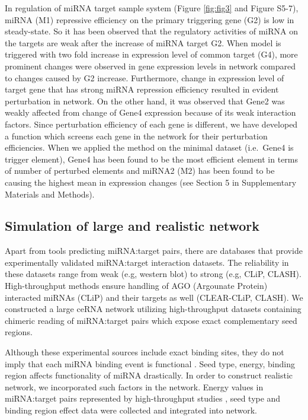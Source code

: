 \documentclass[a4,center,fleqn]{NAR}
\begin{document}
In regulation of miRNA target sample system (Figure \ref{fig:fig3} and
Figure S5-7), miRNA (M1) repressive efficiency on the primary triggering
gene (G2) is low in steady-state. So it has been observed that the
regulatory activities of miRNA on the targets are weak after the
increase of miRNA target G2. When model is triggered with two fold
increase in expression level of common target (G4), more prominent
changes were observed in gene expression levels in network compared to
changes caused by G2 increase. Furthermore, change in expression level
of target gene that has strong miRNA repression efficiency resulted in
evident perturbation in network. On the other hand, it was observed that
Gene2 was weakly affected from change of Gene4 expression because of its
weak interaction factors. Since perturbation efficiency of each gene is
different, we have developed a function which screens each gene in the
network for their perturbation efficiencies. When we applied the method
on the minimal dataset (i.e.~Gene4 is trigger element), Gene4 has been
found to be the most efficient element in terms of number of perturbed
elements and miRNA2 (M2) has been found to be causing the highest mean
in expression changes (see Section 5 in Supplementary Materials and
Methods).

\subsection{Simulation of large and realistic network}

Apart from tools predicting miRNA:target pairs, there are databases that
provide experimentally validated miRNA:target interaction datasets. The
reliability in these datasets range from weak (e.g, western blot) to
strong (e.g, CLiP, CLASH). High-throughput methods ensure handling of
AGO (Argounate Protein) interacted miRNAs (CLiP) and their targets as
well (CLEAR-CLiP, CLASH). We constructed a large ceRNA network utilizing
high-throughput datasets containing chimeric reading of miRNA:target
pairs \citep{helwak_mapping_2013, moore_mirnatarget_2015} which expose
exact complementary seed regions.

Although these experimental sources include exact binding sites, they do
not imply that each miRNA binding event is functional
\citep{liu2019prediction}. Seed type, energy, binding region affects
functionality of miRNA drastically. In order to construct realistic
network, we incorporated such factors in the network. Energy values in
miRNA:target pairs represented by high-throughput studies
\citep{helwak_mapping_2013, moore_mirnatarget_2015}, seed type
\citep{grimson_microrna_2007, bartel_micrornas:_2009, betel2010comprehensive}
and binding region effect
\citep{hausser_analysis_2013, helwak_mapping_2013} data were collected
and integrated into network.
\end{document}
